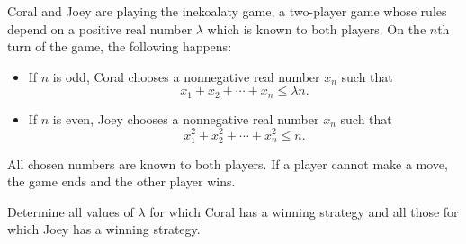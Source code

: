 Coral and Joey are playing the inekoalaty game, a two-player game whose rules depend on a positive real number $\lambda$ which is known to both players. On the $n$th turn of the game, the following happens:
\begin{itemize}
\item If $n$ is odd, Coral chooses a nonnegative real number $x_n$ such that
\[
x_1+x_2+\cdots+x_n\leq \lambda n.
\]
\item If $n$ is even, Joey chooses a nonnegative real number $x_n$ such that
\[
x_1^2+x_2^2+\cdots+x_n^2\leq n.
\]
\end{itemize}
All chosen numbers are known to both players. If a player cannot make a move, the game ends and the other player wins.

Determine all values of $\lambda$ for which Coral has a winning strategy and all those for which Joey has a winning strategy.

